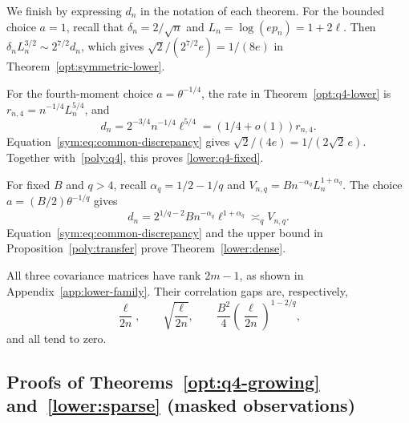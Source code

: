\documentclass[11pt,letterpaper]{article}
\theoremstyle{remark}
\begin{document}
We finish by expressing \(d_n\) in the notation of each theorem.
For the bounded choice \(a=1\), recall that
\(\delta_n=2/\sqrt n\) and \(L_n=\log(ep_n)=1+2\ell\).
Then \(\delta_nL_n^{3/2}\sim2^{7/2}d_n\), which gives
\(\sqrt2/(2^{7/2}e)=1/(8e)\) in
Theorem~\ref{opt:symmetric-lower}.

For the fourth-moment choice \(a=\theta^{-1/4}\), the rate in
Theorem~\ref{opt:q4-lower} is \(r_{n,4}=n^{-1/4}L_n^{5/4}\), and
\[
 d_n=2^{-3/4}n^{-1/4}\ell^{5/4}
       =(1/4+o(1))r_{n,4}.
\]
Equation~\eqref{sym:eq:common-discrepancy} gives
\(\sqrt2/(4e)=1/(2\sqrt2\,e)\).
Together with~\eqref{poly:q4}, this proves
\eqref{lower:q4-fixed}.

For fixed \(B\) and \(q>4\), recall
\(\alpha_q=1/2-1/q\) and
\(V_{n,q}=Bn^{-\alpha_q}L_n^{1+\alpha_q}\).
The choice \(a=(B/2)\theta^{-1/q}\) gives
\[
 d_n=2^{1/q-2}Bn^{-\alpha_q}\ell^{1+\alpha_q}
       \asymp_q V_{n,q}.
\]
Equation~\eqref{sym:eq:common-discrepancy} and the upper bound in
Proposition~\ref{poly:transfer} prove Theorem~\ref{lower:dense}.

All three covariance matrices have rank \(2m-1\), as shown in
Appendix~\ref{app:lower-family}. Their correlation gaps are,
respectively,
\[
 \frac{\ell}{2n},\qquad
 \sqrt{\frac{\ell}{2n}},\qquad
 \frac{B^2}{4}\left(\frac{\ell}{2n}\right)^{1-2/q},
\]
and all tend to zero.

\subsection{Proofs of Theorems~\ref*{opt:q4-growing} and~\ref*{lower:sparse} (masked observations)}
\label{app:q4-growing}
\end{document}
